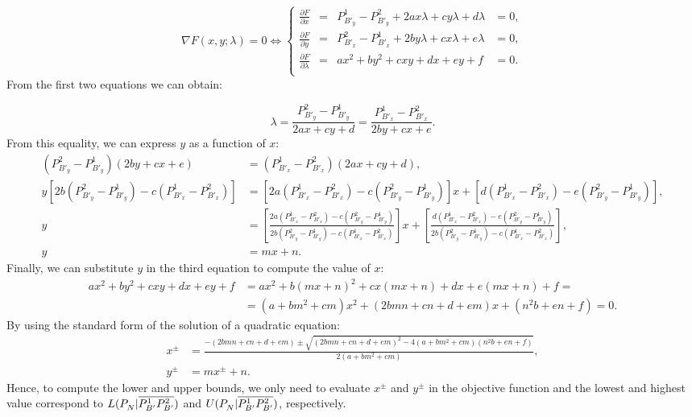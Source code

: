 \documentclass[a4paper]{elsarticle}
\begin{document}
$$\nabla F(x,y;\lambda)=0\Longleftrightarrow
\left\{\begin{array}{rcll}
\frac{\partial F}{\partial x} & = & P^{1}_{B'_y}-P^{2}_{B'_y}+2ax\lambda+cy\lambda+d\lambda& =0,\\
\frac{\partial F}{\partial y} & = & P^{2}_{B'_x}-P^{1}_{B'_x}+2by\lambda+cx\lambda+e\lambda& =0,\\
\frac{\partial F}{\partial \lambda} & = & ax^2+by^2+cxy+dx+ey+f& =0.\\
\end{array}\right.$$
From the first two equations we can obtain:

$$\lambda = \frac{P^{2}_{B'_y}-P^{1}_{B'_y}}{2ax+cy+d}=\frac{P^{1}_{B'_x}-P^{2}_{B'_x}}{2by+cx+e}.$$
From this equality, we can express $y$ as a function of $x$:
\begin{align*}
(P^{2}_{B'_y}-P^{1}_{B'_y})(2by+cx+e)&=(P^{1}_{B'_x}-P^{2}_{B'_x})(2ax+cy+d),\\
y\left[2b(P^{2}_{B'_y}-P^{1}_{B'_y})-c(P^{1}_{B'_x}-P^{2}_{B'_x})\right]&=\left[2a(P^{1}_{B'_x}-P^{2}_{B'_x})-c(P^{2}_{B'_y}-P^{1}_{B'_y})\right]x+\left[d(P^{1}_{B'_x}-P^{2}_{B'_x})-e(P^{2}_{B'_y}-P^{1}_{B'_y})\right],\\
y&=\left[\frac{2a(P^{1}_{B'_x}-P^{2}_{B'_x})-c(P^{2}_{B'_y}-P^{1}_{B'_y})}{2b(P^{2}_{B'_y}-P^{1}_{B'_y})-c(P^{1}_{B'_x}-P^{2}_{B'_x})}\right]x+\left[\frac{d(P^{1}_{B'_x}-P^{2}_{B'_x})-e(P^{2}_{B'_y}-P^{1}_{B'_y})}{2b(P^{2}_{B'_y}-P^{1}_{B'_y})-c(P^{1}_{B'_x}-P^{2}_{B'_x})}\right],\\
y&=mx+n.
\end{align*}
Finally, we can substitute $y$ in the third equation to compute the value of $x$:
\begin{align*}
ax^2+by^2+cxy+dx+ey+f &= ax^2+b(mx+n)^2+cx(mx+n)+dx+e(mx+n)+f =\\
&= (a+bm^2+cm)x^2+(2bmn+cn+d+em)x+(n^2b+en+f)=0.
\end{align*}
By using the standard form of the solution of a quadratic equation:
\begin{align*}
x^{\pm}&=\frac{-(2bmn+cn+d+em)\pm\sqrt{(2bmn+cn+d+em)^2-4(a+bm^2+cm)(n^2b+en+f)}}{2(a+bm^2+cm)},\\
y^{\pm}&=mx^{\pm}+n.
\end{align*}
Hence, to compute the lower and upper bounds, we only need to evaluate $x^{\pm}$ and $y^{\pm}$ in the objective function and the lowest and highest value correspond to $L(P_N^{}|\overline{P_{B'}^1P_{B'}^2})$ and $U(P_N^{}|\overline{P_{B'}^1P_{B'}^2})$, respectively.
\end{document}
